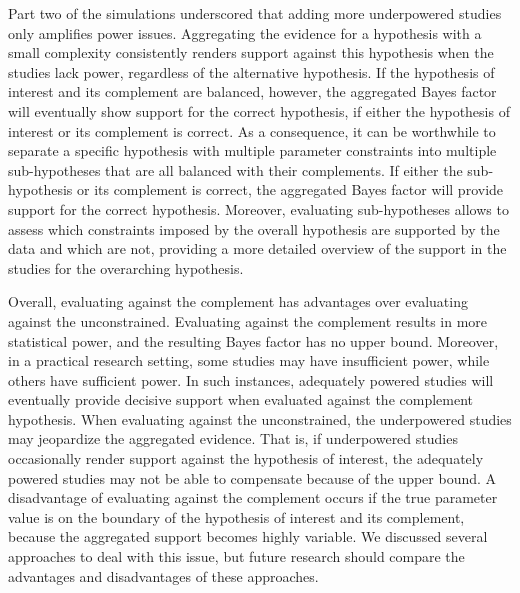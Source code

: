 \documentclass[
]{interact}
\begin{document}
                    Part two of the simulations underscored that adding more underpowered
                    studies only amplifies power issues. Aggregating the evidence for a
                    hypothesis with a small complexity consistently renders support against
                    this hypothesis when the studies lack power, regardless of the
                    alternative hypothesis. If the hypothesis of interest and its complement
                    are balanced, however, the aggregated Bayes factor will eventually show
                    support for the correct hypothesis, if either the hypothesis of interest
                    or its complement is correct. As a consequence, it can be worthwhile to
                    separate a specific hypothesis with multiple parameter constraints into
                    multiple sub-hypotheses that are all balanced with their complements. If
                    either the sub-hypothesis or its complement is correct, the aggregated
                    Bayes factor will provide support for the correct hypothesis. Moreover,
                    evaluating sub-hypotheses allows to assess which constraints imposed by
                    the overall hypothesis are supported by the data and which are not,
                    providing a more detailed overview of the support in the studies for the
                    overarching hypothesis.
                    
                    Overall, evaluating against the complement has advantages over
                    evaluating against the unconstrained. Evaluating against the complement
                    results in more statistical power, and the resulting Bayes factor has no
                    upper bound. Moreover, in a practical research setting, some studies may
                    have insufficient power, while others have sufficient power. In such
                    instances, adequately powered studies will eventually provide decisive
                    support when evaluated against the complement hypothesis. When
                    evaluating against the unconstrained, the underpowered studies may
                    jeopardize the aggregated evidence. That is, if underpowered studies
                    occasionally render support against the hypothesis of interest, the
                    adequately powered studies may not be able to compensate because of the
                    upper bound. A disadvantage of evaluating against the complement occurs
                    if the true parameter value is on the boundary of the hypothesis of
                    interest and its complement, because the aggregated support becomes
                    highly variable. We discussed several approaches to deal with this
                    issue, but future research should compare the advantages and
                    disadvantages of these approaches.
                    
\end{document}
